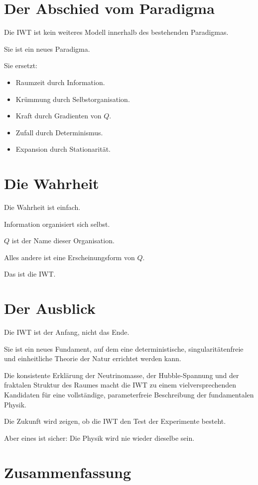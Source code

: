 \section{Der Abschied vom Paradigma}

Die IWT ist kein weiteres Modell innerhalb des bestehenden Paradigmas.

Sie ist ein neues Paradigma.

Sie ersetzt:
\begin{itemize}
\item Raumzeit durch Information.
\item Krümmung durch Selbstorganisation.
\item Kraft durch Gradienten von \( Q \).
\item Zufall durch Determinismus.
\item Expansion durch Stationarität.
\end{itemize}

\section{Die Wahrheit}

Die Wahrheit ist einfach.

Information organisiert sich selbst.

\( Q \) ist der Name dieser Organisation.

Alles andere ist eine Erscheinungsform von \( Q \).

Das ist die IWT.

\section{Der Ausblick}

Die IWT ist der Anfang, nicht das Ende.

Sie ist ein neues Fundament, auf dem eine deterministische, singularitätenfreie und einheitliche Theorie der Natur errichtet werden kann.

Die konsistente Erklärung der Neutrinomasse, der Hubble-Spannung und der fraktalen Struktur des Raumes macht die IWT zu einem vielversprechenden Kandidaten für eine vollständige, parameterfreie Beschreibung der fundamentalen Physik.

Die Zukunft wird zeigen, ob die IWT den Test der Experimente besteht.

Aber eines ist sicher: Die Physik wird nie wieder dieselbe sein.

\section{Zusammenfassung}

